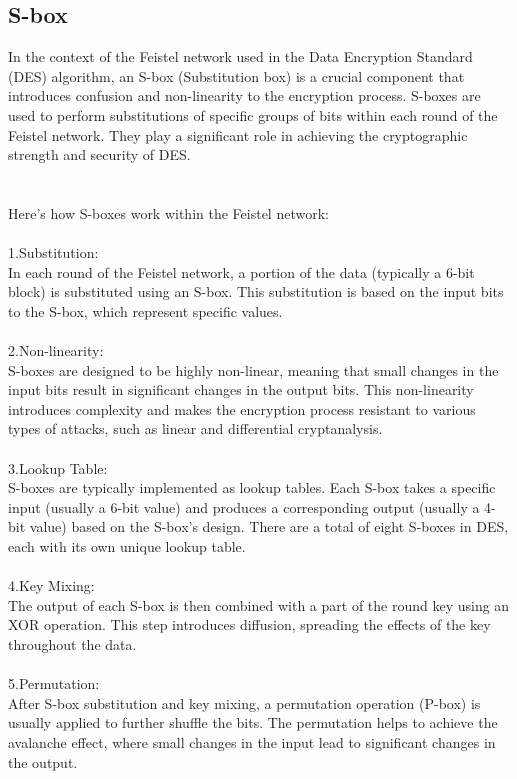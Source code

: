 \documentclass{report}
\begin{document}
\subsection{S-box}
In the context of the Feistel network used in the Data Encryption Standard (DES) algorithm, an S-box (Substitution box) is a crucial component that introduces confusion and non-linearity to the encryption process. S-boxes are used to perform substitutions of specific groups of bits within each round of the Feistel network. They play a significant role in achieving the cryptographic strength and security of DES.\\
\\
\\
Here's how S-boxes work within the Feistel network:\\
\\
1.Substitution:\\
 In each round of the Feistel network, a portion of the data (typically a 6-bit block) is substituted using an S-box. This substitution is based on the input bits to the S-box, which represent specific values.\\
\\
2.Non-linearity:\\
 S-boxes are designed to be highly non-linear, meaning that small changes in the input bits result in significant changes in the output bits. This non-linearity introduces complexity and makes the encryption process resistant to various types of attacks, such as linear and differential cryptanalysis.\\
\\
3.Lookup Table:\\
 S-boxes are typically implemented as lookup tables. Each S-box takes a specific input (usually a 6-bit value) and produces a corresponding output (usually a 4-bit value) based on the S-box's design. There are a total of eight S-boxes in DES, each with its own unique lookup table.\\
\\
4.Key Mixing:\\
 The output of each S-box is then combined with a part of the round key using an XOR operation. This step introduces diffusion, spreading the effects of the key throughout the data.\\
\\
5.Permutation:\\
 After S-box substitution and key mixing, a permutation operation (P-box) is usually applied to further shuffle the bits. The permutation helps to achieve the avalanche effect, where small changes in the input lead to significant changes in the output.\\
\end{document}
